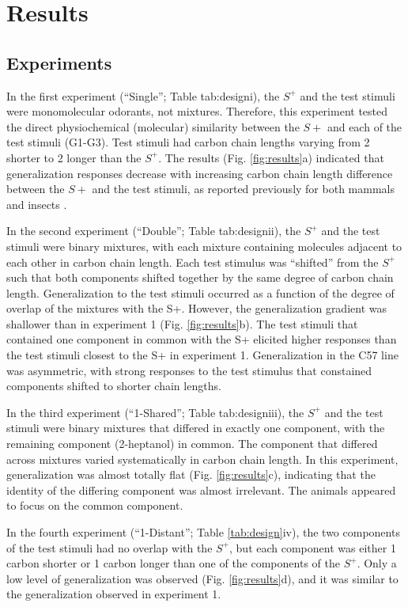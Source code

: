 \section*{Results}
\label{results}
\subsection*{Experiments}
\label{results_experiments}
In the first experiment (``Single''; Table {tab:design}i), the $S^+$ and the test stimuli were monomolecular odorants, not mixtures. Therefore, this experiment tested the direct physiochemical (molecular) similarity between the $S+$ and each of the test stimuli (G1-G3). Test stimuli had carbon chain lengths varying from 2 shorter to 2 longer than the $S^+$.  
The results (Fig. \ref{fig:results}a) indicated that generalization responses decrease with increasing carbon chain length difference between the $S+$ and the test stimuli, as reported previously for both mammals and insects \cite{18810459}\cite{24488965}.  

In the second experiment (``Double''; Table {tab:design}ii), the $S^+$ and the test stimuli were binary mixtures, with each mixture containing molecules adjacent to each other in carbon chain length.  
Each test stimulus was ``shifted'' from the $S^+$ such that both components shifted together by the same degree of carbon chain length.  
Generalization to the test stimuli occurred as a function of the degree of overlap of the mixtures with the S+. However, the generalization gradient was shallower than in experiment 1 (Fig. \ref{fig:results}b). The test stimuli that contained one component in common with the S+ elicited higher responses than the test stimuli closest to the S+ in experiment 1. Generalization in the C57 line was asymmetric, with strong responses to the test stimulus that constained components shifted to shorter chain lengths. 

In the third experiment (``1-Shared''; Table {tab:design}iii), the $S^+$ and the test stimuli were binary mixtures that differed in exactly one component, with the remaining component (2-heptanol) in common.  
The component that differed across mixtures varied systematically in carbon chain length.  
In this experiment, generalization was almost totally flat (Fig. \ref{fig:results}c), indicating that the identity of the differing component was almost irrelevant.  
The animals appeared to focus on the common component.  

In the fourth experiment (``1-Distant''; Table \ref{tab:design}iv), the two components of the test stimuli had no overlap with the $S^+$, but each component was either 1 carbon shorter or 1 carbon longer than one of the components of the $S^+$.  
Only a low level of generalization was observed (Fig. \ref{fig:results}d), and it was similar to the generalization observed in experiment 1.  

